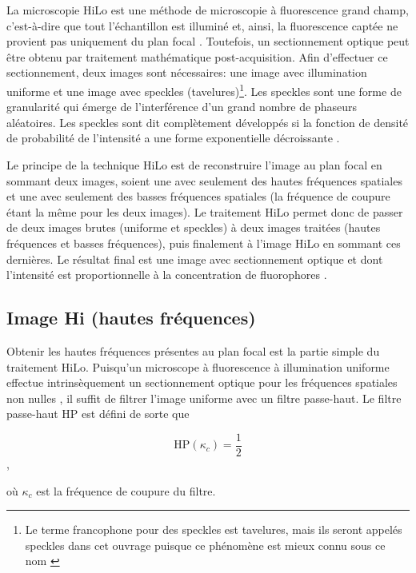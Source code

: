 \documentclass{article}       %
\begin{document}
La microscopie HiLo est une méthode de microscopie à fluorescence grand champ, c'est-à-dire que tout l'échantillon est illuminé et, ainsi, la fluorescence captée ne provient pas uniquement du plan focal \cite{Mertz2008}. Toutefois, un sectionnement optique peut être obtenu par traitement mathématique post-acquisition. Afin d'effectuer ce sectionnement, deux images sont nécessaires: une image avec illumination uniforme et une image avec speckles (tavelures)\footnote{Le terme francophone pour des speckles est tavelures, mais ils seront appelés speckles dans cet ouvrage puisque ce phénomène est mieux connu sous ce nom \cite{Wiki}}. Les speckles sont une forme de granularité qui émerge de l'interférence d'un grand nombre de phaseurs aléatoires. Les speckles sont dit complètement développés si la fonction de densité de probabilité de l'intensité a une forme exponentielle décroissante \cite{Manuel}.

Le principe de la technique HiLo est de reconstruire l'image au plan focal en sommant deux images, soient une avec seulement des hautes fréquences spatiales et une avec seulement des basses fréquences spatiales (la fréquence de coupure étant la même pour les deux images). Le traitement HiLo permet donc de passer de deux images brutes (uniforme et speckles) à deux images traitées (hautes fréquences et basses fréquences), puis finalement à l'image HiLo en sommant ces dernières. Le résultat final est une image avec sectionnement optique et dont l'intensité est proportionnelle à la concentration de fluorophores \cite{Mertz2008}.

\subsection{Image Hi (hautes fréquences)}
\label{ImagesHi}

Obtenir les hautes fréquences présentes au plan focal est la partie simple du traitement HiLo. Puisqu'un microscope à fluorescence à illumination uniforme effectue intrinsèquement un sectionnement optique pour les fréquences spatiales non nulles \cite{Mertz2008}, il suffit de filtrer l'image uniforme avec un filtre passe-haut. Le filtre passe-haut HP est défini de sorte que \cite{Mertz2008}

\begin{equation*}
    \text{HP}(\kappa_{c}) = \frac{1}{2} 
\end{equation*},

où $\kappa_{c}$ est la fréquence de coupure du filtre.
\end{document}
